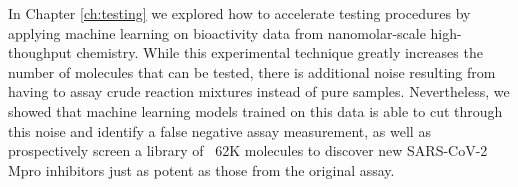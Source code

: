 In Chapter \ref{ch:testing} we explored how to accelerate testing procedures by applying machine learning on bioactivity data from nanomolar-scale high-thoughput chemistry. While this experimental technique greatly increases the number of molecules that can be tested, there is additional noise resulting from having to assay crude reaction mixtures instead of pure samples. Nevertheless, we showed that machine learning models trained on this data is able to cut through this noise and identify a false negative assay measurement, as well as prospectively screen a library of ~62K molecules to discover new SARS-CoV-2 Mpro inhibitors just as potent as those from the original assay.



